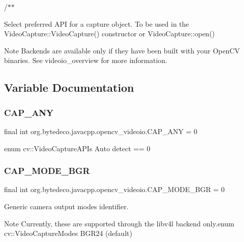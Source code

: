 /$\ast$$\ast$

Select preferred A\+PI for a capture object. To be used in the Video\+Capture\+::\+Video\+Capture() constructor or Video\+Capture\+::open() 

\begin{DoxyNote}{Note}
Backends are available only if they have been built with your Open\+CV binaries. See videoio\+\_\+overview for more information. 
\end{DoxyNote}


\subsection{Variable Documentation}
\mbox{\label{group__videoio__flags__base_ga5919f622200581e7cc68b521cd528f3f}} 
\subsubsection{\texorpdfstring{C\+A\+P\+\_\+\+A\+NY}{CAP\_ANY}}
{\footnotesize\ttfamily final int org.\+bytedeco.\+javacpp.\+opencv\+\_\+videoio.\+C\+A\+P\+\_\+\+A\+NY = 0\hspace{0.3cm}{\ttfamily [static]}}

enum cv\+::\+Video\+Capture\+A\+P\+Is Auto detect == 0 \mbox{\label{group__videoio__flags__base_gaadf3dff0251965990b45d02868b90b23}} 
\subsubsection{\texorpdfstring{C\+A\+P\+\_\+\+M\+O\+D\+E\+\_\+\+B\+GR}{CAP\_MODE\_BGR}}
{\footnotesize\ttfamily final int org.\+bytedeco.\+javacpp.\+opencv\+\_\+videoio.\+C\+A\+P\+\_\+\+M\+O\+D\+E\+\_\+\+B\+GR = 0\hspace{0.3cm}{\ttfamily [static]}}



Generic camera output modes identifier. 

\begin{DoxyNote}{Note}
Currently, these are supported through the libv4l backend only.\+enum cv\+::\+Video\+Capture\+Modes B\+G\+R24 (default) 
\end{DoxyNote}
\mbox{\label{group__videoio__flags__base_ga0d261205f5852e23c0987e9a838e9f91}} 
